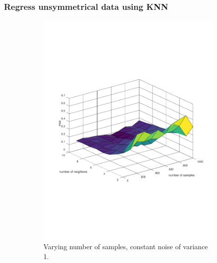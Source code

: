 \documentclass[]{article}
\begin{document}
\subsubsection{Regress unsymmetrical data using KNN}

\begin{figure}[ht]
\centering
\begin{subfigure}{.49\textwidth}
	\centering
	\includegraphics[trim= 10cm 5cm 10cm 5cm, scale=0.4]{proj1-3_2d-neighbors}
	\caption{Varying number of samples, constant noise of variance 1.}
	\label{proj1-3_2d-neighbors}
\end{subfigure}
\begin{subfigure}{.49\textwidth}
	\centering

\end{subfigure}
\end{figure}
\end{document}

